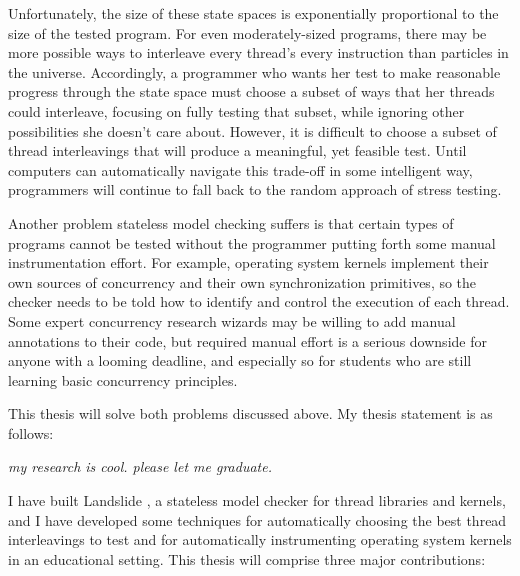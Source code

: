 \documentclass[12pt]{cmuthesis}
\begin{document}
Unfortunately, the size of these state spaces is exponentially proportional to the size of the tested program.
For even moderately-sized programs, there may be more possible ways to interleave every thread's every instruction
than particles in the universe.
Accordingly, a programmer who wants her test to make reasonable progress through the state space must choose a subset of ways that her threads could interleave,
focusing on fully testing that subset, while ignoring other possibilities she doesn't care about.
However, it is difficult to choose a subset of thread interleavings that will produce a meaningful, yet feasible test.
Until computers can automatically navigate this trade-off in some intelligent way,
programmers will continue to fall back to the random approach of stress testing.

Another problem stateless model checking suffers is that certain types of programs cannot be tested without the programmer putting forth some manual instrumentation effort.
For example, operating system kernels implement their own sources of concurrency and their own synchronization primitives,
so the checker needs to be told how to identify and control the execution of each thread.
Some expert concurrency research wizards may be willing to add manual annotations to their code,
but required manual effort is a serious downside for anyone with a looming deadline,
and especially so for students who are still learning basic concurrency principles.

This thesis will solve both problems discussed above.
My thesis statement is as follows:

\begin{center}
	{\em my research is cool. please let me graduate.}
\end{center}

\vspace{1em}

I have built Landslide \cite{landslide}, a stateless model checker for thread libraries and kernels,
and I have developed some techniques for automatically choosing the best thread interleavings to test
and for automatically instrumenting operating system kernels in an educational setting.
This thesis will comprise three major contributions:
\end{document}
